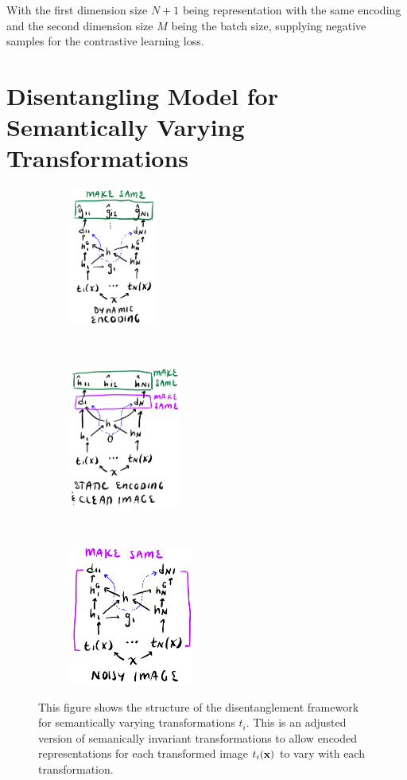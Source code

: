 \documentclass[11pt]{article}
\begin{document}
With the first dimension size $N+1$ being representation with the same encoding and the second dimension size $M$ being the batch size, supplying negative samples for the contrastive learning loss.

\section{Disentangling Model for Semantically Varying Transformations}

\begin{figure}[h]
  \begin{subfigure}[b]{0.33\textwidth}
    \centering
    \includegraphics[height=1.8in]{figs/disentangle_loss_dynamic_varying_ti}
    \caption{}
  \end{subfigure}
  ~
  \begin{subfigure}[b]{0.33\textwidth}
    \centering
    \includegraphics[height=1.8in]{figs/disentangle_loss_static_clean_varying_ti}
    \caption{}
  \end{subfigure}%
  ~
  \begin{subfigure}[b]{0.33\textwidth}
    \centering
    \includegraphics[height=1.8in]{figs/disentangle_loss_noisy_varying_ti}
    \caption{}
  \end{subfigure}%
  \caption{This figure shows the structure of the disentanglement framework for semantically varying transformations $t_i$. This is an adjusted version of semanically invariant transformations to allow encoded representations for each transformed image $t_i(\boldsymbol{\mathrm{x}})$ to vary with each transformation.}
  \label{fig:disent_losses_varying}
\end{figure}
\end{document}
